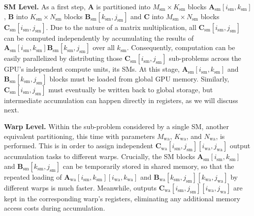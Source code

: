 \documentclass{article}
\theoremstyle{plain}
\theoremstyle{definition}
\theoremstyle{remark}
\renewcommand{\paragraph}[1]{\vspace{0.1em}\noindent\textbf{#1}}
\begin{document}
\paragraph{SM Level.} As a first step, $\mathbf{A}$ is partitioned into $M_\text{sm} \times K_\text{sm}$ blocks $\mathbf{A}_\text{sm}[i_\text{sm}, k_\text{sm}]$, $\mathbf{B}$ into $K_\text{sm} \times N_\text{sm}$ blocks $\mathbf{B}_\text{sm}[k_\text{sm}, j_\text{sm}]$ and $\mathbf{C}$ into $M_\text{sm} \times N_\text{sm}$ blocks $\mathbf{C}_\text{sm}[i_\text{sm}, j_\text{sm}]$. Due to the nature of a matrix multiplication, all $\mathbf{C}_\text{sm}[i_\text{sm}, j_\text{sm}]$ can be computed independently by accumulating the results of $\mathbf{A}_\text{sm}[i_\text{sm}, k_\text{sm}] \mathbf{B}_\text{sm}[k_\text{sm}, j_\text{sm}]$ over all $k_\text{sm}$. Consequently, computation can be easily parallelized by distributing those $\mathbf{C}_\text{sm}[i_\text{sm}, j_\text{sm}]$ sub-problems across the GPU's independent compute units, its SMs. At this stage, $\mathbf{A}_\text{sm}[i_\text{sm}, k_\text{sm}]$ and $\mathbf{B}_\text{sm}[k_\text{sm}, j_\text{sm}]$ blocks must be loaded from global GPU memory. Similarly, $\mathbf{C}_\text{sm}[i_\text{sm}, j_\text{sm}]$ must eventually be written back to global storage, but intermediate accumulation can happen directly in registers, as we will discuss next.

\paragraph{Warp Level.} Within the sub-problem considered by a single SM, another equivalent partitioning, this time with parameters $M_\text{wa}$, $K_\text{wa}$, and $N_\text{wa}$, is performed. This is in order to assign independent $\mathbf{C}_\text{wa}[i_\text{sm}, j_\text{sm}][i_\text{wa}, j_\text{wa}]$ output accumulation tasks to different warps. Crucially, the SM blocks $\mathbf{A}_\text{sm}[i_\text{sm}, k_\text{sm}]$ and $\mathbf{B}_\text{sm}[k_\text{sm}, j_\text{sm}]$ can be temporarily stored in shared memory, so that the repeated loading of $\mathbf{A}_\text{wa}[i_\text{sm}, k_\text{sm}][i_\text{wa}, k_\text{wa}]$ and $\mathbf{B}_\text{wa}[k_\text{sm}, j_\text{sm}][k_\text{wa}, j_\text{wa}]$ by different warps is much faster. Meanwhile, outputs $\mathbf{C}_\text{wa}[i_\text{sm}, j_\text{sm}][i_\text{wa}, j_\text{wa}]$ are kept in the corresponding warp's registers, eliminating any additional memory access costs during accumulation.
\end{document}
